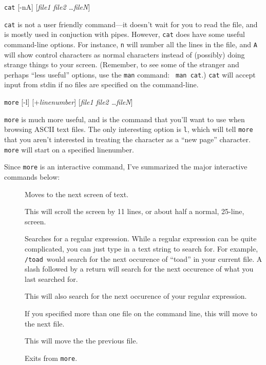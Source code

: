 \begin{command}
{\tt cat} [-nA] [{\sl file1 file2 \ldots fileN}]
\end{command}

{\tt cat} is not a user friendly command---it doesn't wait for you to
read the file, and is mostly used in conjuction with pipes. However,
{\tt cat} does have some useful command-line options. For instance,
{\tt n} will number all the lines in the file, and {\tt A} will show
control characters as normal characters instead of (possibly) doing
strange things to your screen. (Remember, to see some of the stranger
and perhaps ``less useful'' options, use the {\tt man} command: {\tt
  man cat}.) {\tt cat} will accept input from stdin if no files
are specified on the command-line.

\begin{command}
{\tt more} [-l] [+{\sl linenumber}] [{\sl file1 file2 \ldots fileN}]
\end{command}

{\tt more} is much more useful, and is the command that you'll want to
use when browsing ASCII text files.  The only interesting option is
{\tt l}, which will tell {\tt more} that you aren't interested in
treating the character  as a ``new page'' character. {\tt
  more} will start on a specified linenumber.

Since {\tt more} is an interactive command, I've summarized the major
interactive commands below:
\begin{description}
\item [] Moves to the next screen of text.
\item [] This will scroll the screen by 11 lines, or about half
  a normal, 25-line, screen.
\item [\key{/}] Searches for a regular expression. While a regular
  expression can be quite complicated, you can just type in a text
  string to search for. For example, {\tt /toad}\ret\ would search for
  the next occurence of ``toad'' in your current file. A slash
  followed by a return will search for the next occurence of what you
  last searched for.
\item [] This will also search for the next occurence of your
  regular expression.
\item [\key{:}] If you specified more than one file on the
  command line, this will move to the next file.
\item [\key{:}] This will move the the previous file.
\item [] Exits from {\tt more}.
\end{description}

